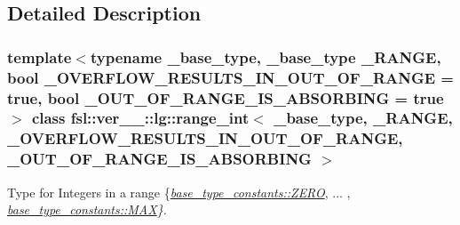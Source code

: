 \subsection{Detailed Description}
\subsubsection*{template$<$typename \+\_\+base\+\_\+type, \+\_\+base\+\_\+type \+\_\+\+R\+A\+N\+GE, bool \+\_\+\+O\+V\+E\+R\+F\+L\+O\+W\+\_\+\+R\+E\+S\+U\+L\+T\+S\+\_\+\+I\+N\+\_\+\+O\+U\+T\+\_\+\+O\+F\+\_\+\+R\+A\+N\+GE = true, bool \+\_\+\+O\+U\+T\+\_\+\+O\+F\+\_\+\+R\+A\+N\+G\+E\+\_\+\+I\+S\+\_\+\+A\+B\+S\+O\+R\+B\+I\+NG = true$>$\newline
class fsl\+::ver\+\_\+\_\+::lg\+::range\+\_\+int$<$ \+\_\+base\+\_\+type, \+\_\+\+R\+A\+N\+G\+E, \+\_\+\+O\+V\+E\+R\+F\+L\+O\+W\+\_\+\+R\+E\+S\+U\+L\+T\+S\+\_\+\+I\+N\+\_\+\+O\+U\+T\+\_\+\+O\+F\+\_\+\+R\+A\+N\+G\+E, \+\_\+\+O\+U\+T\+\_\+\+O\+F\+\_\+\+R\+A\+N\+G\+E\+\_\+\+I\+S\+\_\+\+A\+B\+S\+O\+R\+B\+I\+N\+G $>$}

Type for Integers in a range \{{\itshape \mbox{\hyperlink{structfsl_1_1ver__1__0_1_1lg_1_1range__int_1_1base__type__constants_ada13cd01546095bb61095888cd0ab41d}{base\+\_\+type\+\_\+constants\+::\+Z\+E\+RO}}}, ... , {\itshape \mbox{\hyperlink{structfsl_1_1ver__1__0_1_1lg_1_1range__int_1_1base__type__constants_ae6291d70cbe40dbc429eba9cc4db9d27}{base\+\_\+type\+\_\+constants\+::\+M\+AX}}\}}. 

